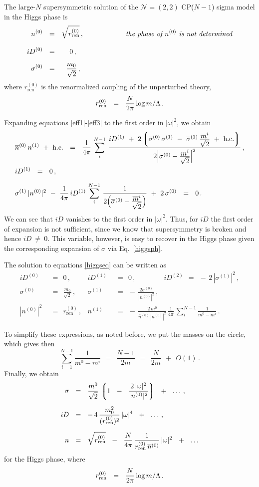 \documentclass[epsfig,12pt]{article}
\newcommand{\ntwot}{${\mathcal N}= \left(2,2\right) $ }
\newcommand{\ov}{\overline}
\newcommand{\lgr}{\left\lgroup}
\newcommand{\rgr}{\right\rgroup}
\newcommand{\nz}{{n^{(0)}}}
\newcommand{\no}{{n^{(1)}}}
\newcommand{\bnz}{{\ov{n}{}^{(0)}}}
\newcommand{\Dz}{{D^{(0)}}}
\newcommand{\Do}{{D^{(1)}}}
\newcommand{\sigz}{{\sigma^{(0)}}}
\newcommand{\sigo}{{\sigma^{(1)}}}
\newcommand{\bsigz}{{\ov{\sigma}{}^{(0)}}}
\newcommand{\bsigo}{{\ov{\sigma}{}^{(1)}}}
\newcommand{\rrenz}{{r_\text{ren}^{(0)}}}
\begin{document}
	The large-$N$ supersymmetric solution of the \ntwot CP($N-1$) sigma model
	in the Higgs phase is
\begin{align*}
%
	\nz & ~~=~~ \sqrt{\rrenz}\,,   \qquad\qquad\qquad\text{\it the phase of $\nz$ is not determined}\\[3mm]
%
	i\Dz & ~~=~~ ~~~\,0\,, \\[2mm]
%
	\sigz & ~~=~~ ~~\frac{m_0}{\sqrt{2}}\,,
\end{align*}
	where $ \rrenz $ is the renormalized coupling of the unperturbed theory,
\[
	\rrenz ~~=~~ \frac{N}{2\pi}\,{\rm log}\,m/\Lambda\,.
\]

	Expanding equations \eqref{eff1}-\eqref{eff3} to the first order in $|\omega|^2$, we obtain
\begin{align}
%
\notag
	&
	\bnz\,\no ~+~ \text{h.c.} ~~=~~
	\frac{1}{4\pi}\, \sum_{i}^{N-1}\, 
		\frac{ i\Do ~+~ 2\lgr \bsigz\, \sigo ~-~ \bsigo\,\frac{\displaystyle m^i}{\displaystyle \sqrt{2}}
				~+~ \text{h.c.} \rgr }
			{ 2 \Bigl| \sigz - \frac{\displaystyle m^i}{\sqrt{\displaystyle 2}} \Bigr|^2 }\,, \\
%
\label{higgseq}
	&
	i\Do ~~=~~ 0\,, \\[2mm]
%
\notag
	&
	\sigo\,|\nz|^2  ~-~ 
	\frac{1}{4\pi}\,i\Do\, \sum_{i}^{N-1}\, \frac{1}
				{2\Bigl( \bsigz - \frac{\displaystyle \ov{m}{}^i}{\displaystyle \sqrt{2}} \Bigr) }
	~+~ 2\,\sigz ~~=~~ 0\,.
\end{align}
	We can see that $ iD $ vanishes to the first order in $ |\omega|^2 $.
	Thus, for $ iD $ the first order of expansion is not sufficient, since we know that supersymmetry
	is broken and hence $ iD ~\neq~ 0 $.
	This variable, however, is easy to recover in the Higgs phase given the corresponding expansion of $ \sigma $
	via Eq.~\eqref{higgsph}.

	The solution to equations \eqref{higgseq} can be written as
\begin{align*}
%
	i \Dz & ~~=~~ 0\,,                     &       i\Do & ~~=~~ 0\,,  
			\qquad\qquad iD^{(2)} ~~=~~ -\,2\,|\sigo|^2\,, \\[3mm]
%
	\sigz & ~~=~~ \frac{m_0}{\sqrt{2}}\,,  &       \sigo & ~~=~~ -\,\frac{2\sigz}{|\nz|^2}\,, \\[3mm]
%
	|\nz|^2 & ~~=~~ \rrenz\,,              &    
			\no & ~~=~~ -\,\frac{2\,m^0}{\bnz\,|\nz|^2}\,\frac{1}{4\pi}\,
					\sum_{i}^{N-1} \frac{1}{m^0 - m^i}\,.
\end{align*}	

	To simplify these expressions, as noted before, we put the masses on the circle, which gives then
\[
	\sum_{i=1}^{N-1} \frac{1}{m^0 - m^i} ~~=~~ \frac{N-1}{2m} ~~=~~ \frac{N}{2m} ~~+~~ O(1)\,.
\]
	Finally, we obtain 
\begin{align*}
%
	\sigma & ~~=~~ \frac{m^0}{\sqrt{2}}\, \lgr 1 ~~-~~ \frac{2\,|\omega|^2}{|\nz|^2} \rgr ~~+~~ \ldots \,,
	\\[2mm]
%
	i D & ~~=~~ -\, 4\, \frac{m_0^2}{(\rrenz)^2}\, |\omega|^4 ~~+~~ \ldots\,,
	\\[2mm]
%
	n & ~~=~~ \sqrt{\rrenz} ~~-~~ \frac{N}{4\pi}\,\frac{1}{\rrenz\,\bnz}\,|\omega|^2 ~~+~~ \ldots
\end{align*}
	for the Higgs phase, where
\[
	\rrenz ~~=~~ \frac{N}{2\pi}\,{\rm log}\,m/\Lambda\,.
\]
\end{document}

